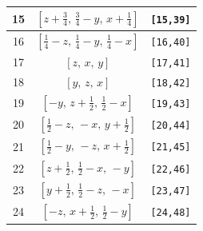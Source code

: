 \documentclass[fleqn,8pt]{jsarticle}
\begin{document}
\begin{longtable}{ccc}
15 & $\left[ z + \frac{3}{4},\, \frac{3}{4} - y,\, x + \frac{1}{4} \right]$ & {\tt [15,39]} \\ \hline
16 & $\left[ \frac{1}{4} - z,\, \frac{1}{4} - y,\, \frac{1}{4} - x \right]$ & {\tt [16,40]} \\ \hline
17 & $\left[ z,\, x,\, y \right]$ & {\tt [17,41]} \\ \hline
18 & $\left[ y,\, z,\, x \right]$ & {\tt [18,42]} \\ \hline
19 & $\left[ - y,\, z + \frac{1}{2},\, \frac{1}{2} - x \right]$ & {\tt [19,43]} \\ \hline
20 & $\left[ \frac{1}{2} - z,\, - x,\, y + \frac{1}{2} \right]$ & {\tt [20,44]} \\ \hline
21 & $\left[ \frac{1}{2} - y,\, - z,\, x + \frac{1}{2} \right]$ & {\tt [21,45]} \\ \hline
22 & $\left[ z + \frac{1}{2},\, \frac{1}{2} - x,\, - y \right]$ & {\tt [22,46]} \\ \hline
23 & $\left[ y + \frac{1}{2},\, \frac{1}{2} - z,\, - x \right]$ & {\tt [23,47]} \\ \hline
24 & $\left[ - z,\, x + \frac{1}{2},\, \frac{1}{2} - y \right]$ & {\tt [24,48]} \\
\end{longtable}
\end{document}
